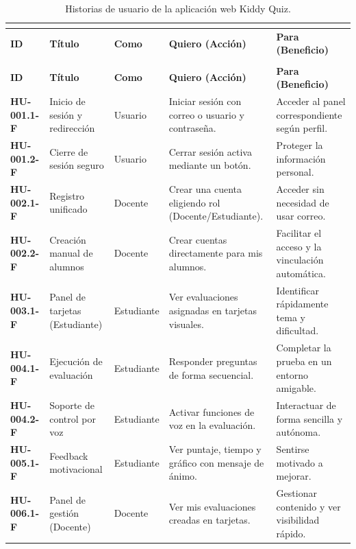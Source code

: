 \begin{small}
\begin{longtable}{|>{\bfseries}p{2.1cm}|p{3.2cm}|p{1.7cm}|p{4cm}|p{3.5cm}|}
\caption{Historias de usuario de la aplicación web Kiddy Quiz.}\label{tab:hu}\\
\hline\rowcolor{headblue}\multicolumn{5}{|c|}{\textbf{Aplicación web Kiddy Quiz}}\\\hline
\rowcolor{grpgray}\textbf{ID} & \textbf{Título} & \textbf{Como} & \textbf{Quiero (Acción)} & \textbf{Para (Beneficio)}\\\hline
\endfirsthead
\hline\rowcolor{headblue}\multicolumn{5}{|c|}{\textbf{Aplicación web Kiddy Quiz (continuación)}}\\\hline
\rowcolor{grpgray}\textbf{ID} & \textbf{Título} & \textbf{Como} & \textbf{Quiero (Acción)} & \textbf{Para (Beneficio)}\\\hline
\endhead
\hline\endlastfoot
HU-001.1-F & Inicio de sesión y redirección & Usuario & Iniciar sesión con correo o usuario y contraseña. & Acceder al panel correspondiente según perfil. \\\hline
HU-001.2-F & Cierre de sesión seguro & Usuario & Cerrar sesión activa mediante un botón. & Proteger la información personal. \\\hline
HU-002.1-F & Registro unificado & Docente & Crear una cuenta eligiendo rol (Docente/Estudiante). & Acceder sin necesidad de usar correo. \\\hline
HU-002.2-F & Creación manual de alumnos & Docente & Crear cuentas directamente para mis alumnos. & Facilitar el acceso y la vinculación automática. \\\hline
HU-003.1-F & Panel de tarjetas (Estudiante) & Estudiante & Ver evaluaciones asignadas en tarjetas visuales. & Identificar rápidamente tema y dificultad. \\\hline
HU-004.1-F & Ejecución de evaluación & Estudiante & Responder preguntas de forma secuencial. & Completar la prueba en un entorno amigable. \\\hline
HU-004.2-F & Soporte de control por voz & Estudiante & Activar funciones de voz en la evaluación. & Interactuar de forma sencilla y autónoma. \\\hline
HU-005.1-F & Feedback motivacional & Estudiante & Ver puntaje, tiempo y gráfico con mensaje de ánimo. & Sentirse motivado a mejorar. \\\hline
HU-006.1-F & Panel de gestión (Docente) & Docente & Ver mis evaluaciones creadas en tarjetas. & Gestionar contenido y ver visibilidad rápido. \\\hline

\end{longtable}
\end{small}
